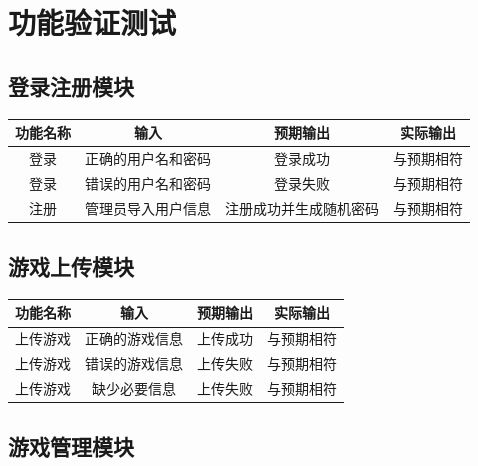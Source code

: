 \documentclass[12pt]{ctexart} %
\begin{document}
\section{功能验证测试}

\subsection{登录注册模块}
\begin{table}[H]
\centering
\begin{tabular}{|c|c|c|c|}
  \hline
  功能名称 & 输入 & 预期输出 & 实际输出 \\
  \hline
  登录 & 正确的用户名和密码 & 登录成功 & 与预期相符 \\
  \hline
  登录 & 错误的用户名和密码 & 登录失败 & 与预期相符 \\
  \hline
  注册 & 管理员导入用户信息 & 注册成功并生成随机密码 & 与预期相符 \\
  \hline
  \end{tabular}
\end{table}


\subsection{游戏上传模块}

\begin{table}[H]
  \centering
  \begin{tabular}{|c|c|c|c|}
    \hline
    功能名称 & 输入 & 预期输出 & 实际输出 \\
    \hline
    上传游戏 & 正确的游戏信息 & 上传成功 & 与预期相符 \\
    \hline
    上传游戏 & 错误的游戏信息 & 上传失败 & 与预期相符 \\
    \hline
    上传游戏 & 缺少必要信息 & 上传失败 & 与预期相符 \\
    \hline
  \end{tabular}
\end{table}

\subsection{游戏管理模块}
\end{document}
